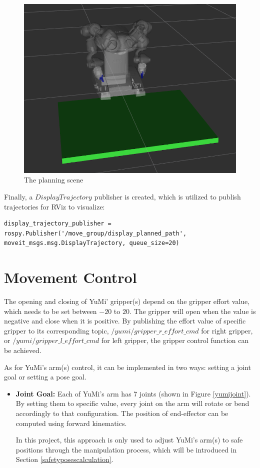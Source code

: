 \begin{figure}[H]
\centering
\includegraphics[width = 0.5\columnwidth]{Implementation/mp/planningscene.png}
\caption{The planning scene}
\label{scene}
\end{figure}

Finally, a $DisplayTrajectory$ publisher is created, which is utilized to publish trajectories for RViz to visualize:

\begin{verbatim}
display_trajectory_publisher = rospy.Publisher('/move_group/display_planned_path', 	moveit_msgs.msg.DisplayTrajectory, queue_size=20)
\end{verbatim}


\section{Movement Control}
The opening and closing of YuMi' gripper(s) depend on the gripper effort value, which needs to be set between $-20$ to $20$. The gripper will open when the value is negative and close when it is positive. By publishing the effort value of specific gripper to its corresponding topic, $/yumi/gripper\_r\_effort\_cmd$ for right gripper, or $/yumi/gripper\_l\_effort\_cmd$ for left gripper, the gripper control function can be achieved. 


As for YuMi's arm(s) control, it can be implemented in two ways: setting a joint goal or setting a pose goal.

\begin{itemize}
    \item \textbf{Joint Goal:} Each of YuMi's arm has 7 joints (shown in Figure \ref{yumijoint}). By setting them to specific value, every joint on the arm will rotate or bend accordingly to that configuration. The position of end-effector can be computed using forward kinematics.
    
    In this project, this approach is only used to adjust YuMi's arm(s) to safe positions through the manipulation process, which will be introduced in Section \ref{safetyposescalculation}.
\end{itemize}


